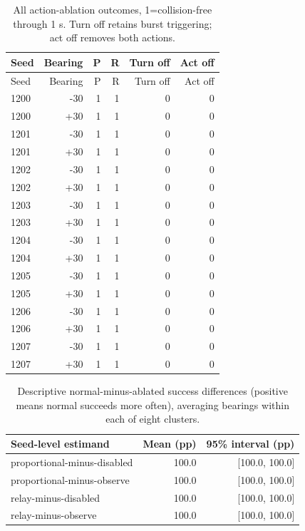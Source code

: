 \documentclass[10pt,letterpaper]{article}
\begin{document}
{\small
\begin{longtable}{lrrrrr}
\caption{All action-ablation outcomes, 1=collision-free through 1 s. Turn off retains burst triggering; act off removes both actions.}\\
\toprule
Seed & Bearing & P & R & Turn off & Act off\\
\midrule\endfirsthead
\toprule
Seed & Bearing & P & R & Turn off & Act off\\
\midrule\endhead
1200 & -30 & 1 & 1 & 0 & 0\\
1200 & +30 & 1 & 1 & 0 & 0\\
1201 & -30 & 1 & 1 & 0 & 0\\
1201 & +30 & 1 & 1 & 0 & 0\\
1202 & -30 & 1 & 1 & 0 & 0\\
1202 & +30 & 1 & 1 & 0 & 0\\
1203 & -30 & 1 & 1 & 0 & 0\\
1203 & +30 & 1 & 1 & 0 & 0\\
1204 & -30 & 1 & 1 & 0 & 0\\
1204 & +30 & 1 & 1 & 0 & 0\\
1205 & -30 & 1 & 1 & 0 & 0\\
1205 & +30 & 1 & 1 & 0 & 0\\
1206 & -30 & 1 & 1 & 0 & 0\\
1206 & +30 & 1 & 1 & 0 & 0\\
1207 & -30 & 1 & 1 & 0 & 0\\
1207 & +30 & 1 & 1 & 0 & 0\\
\bottomrule
\end{longtable}
}

\begin{table}[H]
\centering\small
\caption{Descriptive normal-minus-ablated success differences (positive means normal succeeds more often), averaging bearings within each of eight clusters.}
\begin{tabular}{lrr}
\toprule
Seed-level estimand & Mean (pp) & 95\% interval (pp)\\
\midrule
proportional-minus-disabled & 100.0 & [100.0, 100.0]\\
proportional-minus-observe & 100.0 & [100.0, 100.0]\\
relay-minus-disabled & 100.0 & [100.0, 100.0]\\
relay-minus-observe & 100.0 & [100.0, 100.0]\\
\bottomrule
\end{tabular}
\end{table}
\end{document}
